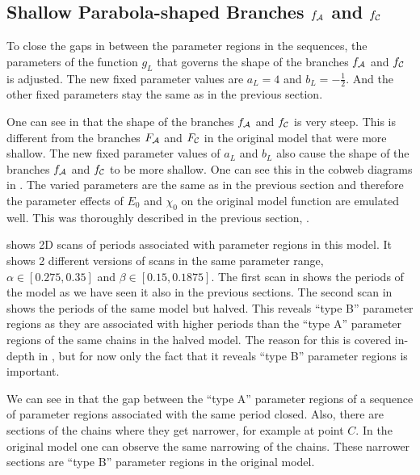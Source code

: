 \subsection{Shallow Parabola-shaped Branches $f_{\mathcal{A}}$ and $f_{\mathcal{C}}$}
\label{sec:setup.quad.hyper.2}

To close the gaps in between the parameter regions in the sequences, the parameters of the function $g_L$ that governs the shape of the branches $f_{\mathcal{A}}$ and $f_{\mathcal{C}}$ is adjusted.
The new fixed parameter values are $a_L = 4$ and $b_L = -\frac{1}{2}$.
And the other fixed parameters stay the same as in the previous section.

One can see in  that the shape of the branches $f_{\mathcal{A}}$ and $f_{\mathcal{C}}$ is very steep.
This is different from the branches $F_{\mathcal{A}}$ and $F_{\mathcal{C}}$ in the original model that were more shallow.
The new fixed parameter values of $a_L$ and $b_L$ also cause the shape of the branches $f_{\mathcal{A}}$ and $f_{\mathcal{C}}$ to be more shallow.
One can see this in the cobweb diagrams in .
The varied parameters are the same as in the previous section and therefore the parameter effects of $E_0$ and $\chi_0$ on the original model function are emulated well.
This was thoroughly described in the previous section, .

 shows 2D scans of periods associated with parameter regions in this model.
It shows 2 different versions of scans in the same parameter range, $\alpha \in [0.275, 0.35]$ and $\beta \in [0.15, 0.1875]$.
The first scan in  shows the periods of the model as we have seen it also in the previous sections.
The second scan in  shows the periods of the same model but halved.
This reveals ``type B'' parameter regions as they are associated with higher periods than the ``type A'' parameter regions of the same chains in the halved model.
The reason for this is covered in-depth in , but for now only the fact that it reveals ``type B'' parameter regions is important.

We can see in  that the gap between the ``type A'' parameter regions of a sequence of parameter regions associated with the same period closed.
Also, there are sections of the chains where they get narrower, for example at point $C$.
In the original model one can observe the same narrowing of the chains.
These narrower sections are ``type B'' parameter regions in the original model.


